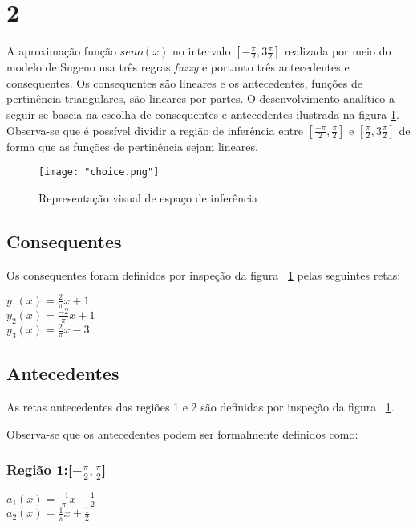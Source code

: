 \documentclass{article}
\begin{document}
\section*{2}

A aproximação função $seno(x)$ no intervalo $[-\frac{\pi}{2}, 3 \frac{\pi}{2}]$
realizada por meio do modelo de Sugeno usa três regras \emph{fuzzy} e portanto
três antecedentes e consequentes. Os consequentes são lineares e os
antecedentes, funções de pertinência triangulares, são lineares por partes. O
desenvolvimento analítico a seguir se baseia na escolha de consequentes e
antecedentes ilustrada na figura \ref{fig:choice}. Observa-se que é possível
dividir a região de inferência entre $[\frac{-\pi}{2}, \frac{\pi}{2}]$ e
$[\frac{\pi}{2}, 3 \frac{\pi}{2}]$ de forma que as funções de pertinência sejam
lineares.

\begin{figure}
    \centering
    \texttt{[image: "choice.png"]}
    \caption{Representação visual de espaço de inferência}
    \label{fig:choice}
\end{figure}

\subsection*{Consequentes}

Os consequentes foram definidos por inspeção da figura ~\ref{fig:choice} pelas
seguintes retas:

$y_1(x) = \frac{2}{\pi}x + 1$  \\
$y_2(x) = \frac{-2}{\pi}x + 1$ \\
$y_3(x) = \frac{2}{\pi}x - 3$ \\

\subsection*{Antecedentes}

As retas antecedentes das regiões 1 e 2 são definidas por inspeção da figura
~\ref{fig:choice}.

Observa-se que os antecedentes podem ser formalmente definidos como:

\subsubsection*{Região 1:[$-\frac{\pi}{2}, \frac{\pi}{2}$]}

$a_1(x) = \frac{-1}{\pi}x + \frac{1}{2}$ \\
$a_2(x) = \frac{1}{\pi}x + \frac{1}{2}$ \\
\end{document}
